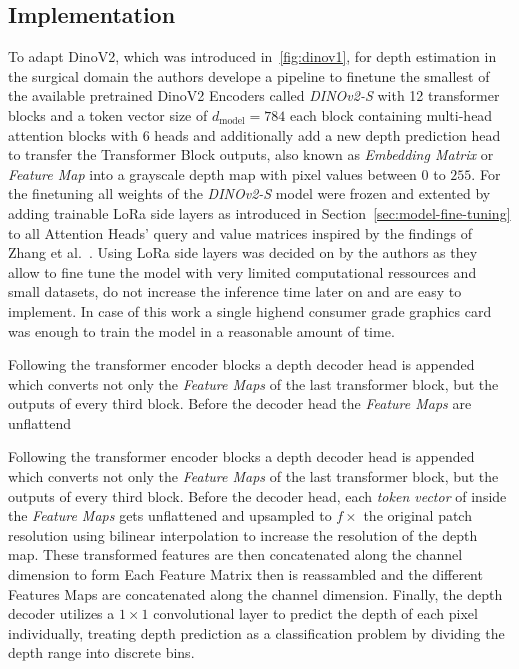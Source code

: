 \subsection*{Implementation}
To adapt DinoV2, which was introduced in~\ref{fig:dinov1}, for depth estimation in the surgical domain the authors develope a pipeline to finetune the smallest of the available pretrained DinoV2 Encoders called \emph{DINOv2-S} with 12 transformer blocks and a token vector size of $d_{\text{model}}=784$ each block containing multi-head attention blocks with 6 heads and additionally add a new depth prediction head to transfer the Transformer Block outputs, also known as \emph{Embedding Matrix} or \emph{Feature Map} into a grayscale depth map with pixel values between $0$ to $255$.
For the finetuning all weights of the \emph{DINOv2-S} model were frozen and extented by adding trainable LoRa side layers as introduced in Section~\ref{sec:model-fine-tuning} to all Attention Heads' query and value matrices inspired by the findings of Zhang et al.~\cite{Zhang2021}. 
Using LoRa side layers was decided on by the authors as they allow to fine tune the model with very limited computational ressources and small datasets, do not increase the inference time later on and are easy to implement. 
In case of this work a single highend consumer grade graphics card was enough to train the model in a reasonable amount of time.

Following the transformer encoder blocks a depth decoder head is appended which converts not only the \emph{Feature Maps} of the last transformer block, but the outputs of every third block. 
Before the decoder head the \emph{Feature Maps}  are unflattend 

Following the transformer encoder blocks a depth decoder head is appended which converts not only the \emph{Feature Maps} of the last transformer block, but the outputs of every third block. 
Before the decoder head, each \emph{token vector} of inside the \emph{Feature Maps} gets unflattened and upsampled to $f\times$ the original patch resolution using bilinear interpolation to increase the resolution of the depth map.
These transformed features are then concatenated along the channel dimension to form Each Feature Matrix then is reassambled and the different Features Maps are concatenated along the channel dimension.
Finally, the depth decoder utilizes a $1\times1$ convolutional layer to predict the depth of each pixel individually, treating depth prediction as a classification problem by dividing the depth range into discrete bins.

